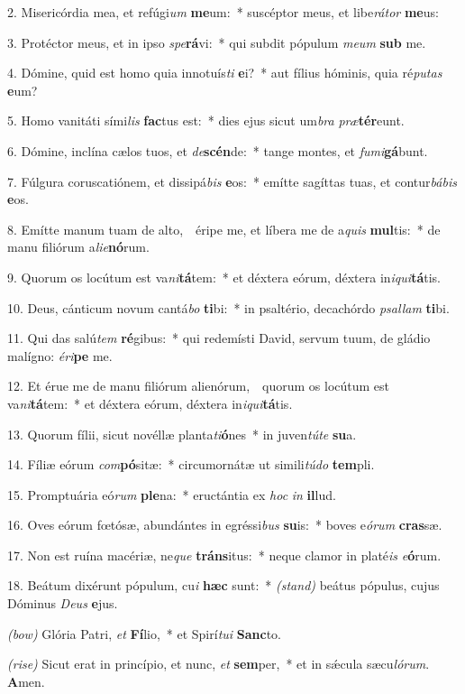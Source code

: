 2. Misericórdia mea, et refúgi\textit{um} \textbf{me}um:~*
	suscéptor meus, et libe\textit{rá}\textit{tor} \textbf{me}us:

3. Protéctor meus, et in ipso \textit{spe}\textbf{rá}vi:~*
	qui subdit pópulum \textit{me}\textit{um} \textbf{sub} me.

4. Dómine, quid est homo quia innotuís\textit{ti} \textbf{e}i?~*
	aut fílius hóminis, quia ré\textit{pu}\textit{tas} \textbf{e}um?

5. Homo vanitáti sími\textit{lis} \textbf{fac}tus est:~*
	dies ejus sicut um\textit{bra} \textit{præ}\textbf{tér}\-eunt.

6. Dómine, inclína cælos tuos, et \textit{de}\textbf{scén}de:~*
	tange montes, et \textit{fu}\textit{mi}\textbf{gá}bunt.

7. Fúlgura coruscatiónem, et dissipá\textit{bis} \textbf{e}os:~*
	emítte sagíttas tuas, et contur\textit{bá}\textit{bis} \textbf{e}os.

8. Emítte manum tuam de alto,~\GreDagger\
	éripe me, et líbera me de a\textit{quis} \textbf{mul}tis:~*
	de manu filiórum a\textit{li}\textit{e}\textbf{nó}rum.

9. Quorum os locútum est va\textit{ni}\textbf{tá}tem:~*
	et déxtera eórum, déxtera in\textit{i}\textit{qui}\textbf{tá}tis.

10. Deus, cánticum novum cantá\textit{bo} \textbf{ti}bi:~*
	in psaltério, decachórdo \textit{psal}\textit{lam} \textbf{ti}bi.

11. Qui das salú\textit{tem} \textbf{ré}gibus:~*
	qui redemísti David, servum tuum, de gládio malígno: \textit{é}\textit{ri}\textbf{pe} me.

12. Et érue me de manu filiórum alienórum,~\GreDagger\
	quorum os locútum est va\textit{ni}\textbf{tá}tem:~*
	et déxtera eórum, déxtera in\textit{i}\textit{qui}\textbf{tá}tis.

13. Quorum fílii, sicut novéllæ planta\textit{ti}\textbf{ó}nes~*
	in juven\textit{tú}\textit{te} \textbf{su}a.

14. Fíliæ eórum \textit{com}\textbf{pó}sitæ:~*
	circumornátæ ut simili\textit{tú}\textit{do} \textbf{tem}pli.

15. Promptuária eó\textit{rum} \textbf{ple}na:~*
	eructántia ex \textit{hoc} \textit{in} \textbf{il}lud.

16. Oves eórum f{\oe}tósæ, abundántes in egréssi\textit{bus} \textbf{su}is:~*
	boves e\textit{ó}\textit{rum} \textbf{cras}sæ.

17. Non est ruína macériæ, ne\textit{que} \textbf{tráns}itus:~*
	neque clamor in platé\textit{is} \textit{e}\textbf{ó}rum.

18. Beátum dixérunt pópulum, cu\textit{i} \textbf{hæc} sunt:~* {\color{red}\textit{(stand)}}
	beátus pópulus, cujus Dóminus \textit{De}\textit{us} \textbf{e}jus.

{\color{red}\textit{(bow)}} Glória Patri, \textit{et} \textbf{Fí}lio,~*
	et Spirí\textit{tu}\textit{i} \textbf{Sanc}to.

{\color{red}\textit{(rise)}} Sicut erat in princípio, et nunc, \textit{et} \textbf{sem}per,~*
	et in s\'{\ae}cula sæcu\textit{ló}\textit{rum}. \textbf{A}men.